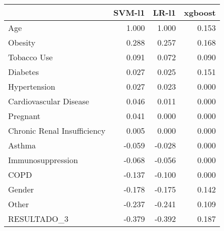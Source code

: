 \begin{tabular}{lrrr}
\toprule
{} &  SVM-l1 &  LR-l1 &  xgboost \\
\midrule
Age                         &   1.000 &  1.000 &    0.153 \\
Obesity                     &   0.288 &  0.257 &    0.168 \\
Tobacco Use                 &   0.091 &  0.072 &    0.090 \\
Diabetes                    &   0.027 &  0.025 &    0.151 \\
Hypertension                &   0.027 &  0.023 &    0.000 \\
Cardiovascular Disease      &   0.046 &  0.011 &    0.000 \\
Pregnant                    &   0.041 &  0.000 &    0.000 \\
Chronic Renal Insufficiency &   0.005 &  0.000 &    0.000 \\
Asthma                      &  -0.059 & -0.028 &    0.000 \\
Immunosuppression           &  -0.068 & -0.056 &    0.000 \\
COPD                        &  -0.137 & -0.100 &    0.000 \\
Gender                      &  -0.178 & -0.175 &    0.142 \\
Other                       &  -0.237 & -0.241 &    0.109 \\
RESULTADO\_3                 &  -0.379 & -0.392 &    0.187 \\
\bottomrule
\end{tabular}
